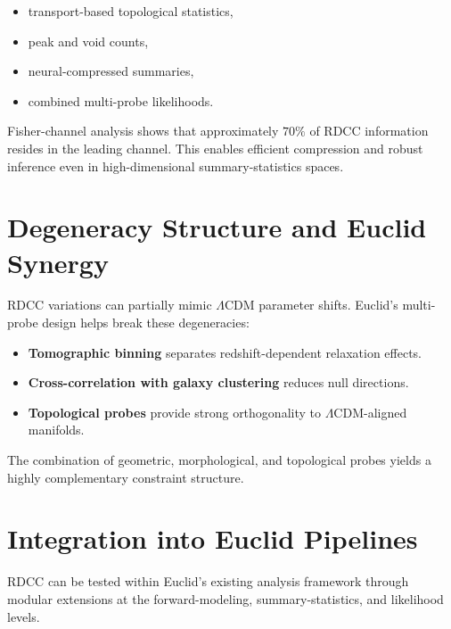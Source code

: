 \documentclass[11pt,a4paper]{article}
\begin{document}
\begin{itemize}
    \item transport-based topological statistics,
    \item peak and void counts,
    \item neural-compressed summaries,
    \item combined multi-probe likelihoods.
\end{itemize}

Fisher-channel analysis shows that approximately $70\%$ of RDCC information
resides in the leading channel. This enables efficient compression and robust
inference even in high-dimensional summary-statistics spaces.


\section{Degeneracy Structure and Euclid Synergy}

RDCC variations can partially mimic $\Lambda$CDM parameter shifts. Euclid's
multi-probe design helps break these degeneracies:

\begin{itemize}
    \item \textbf{Tomographic binning} separates redshift-dependent relaxation effects.
    \item \textbf{Cross-correlation with galaxy clustering} reduces null directions.
    \item \textbf{Topological probes} provide strong orthogonality to
    $\Lambda$CDM-aligned manifolds.
\end{itemize}

The combination of geometric, morphological, and topological probes yields a
highly complementary constraint structure.


\section{Integration into Euclid Pipelines}

RDCC can be tested within Euclid's existing analysis framework through modular
extensions at the forward-modeling, summary-statistics, and likelihood levels.
\end{document}
